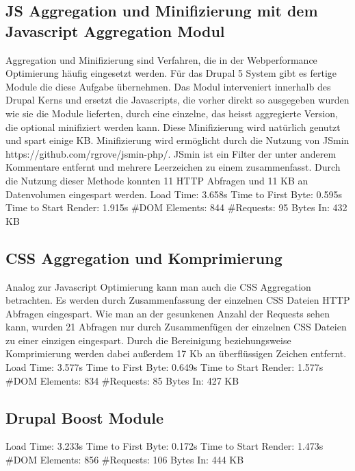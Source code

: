 

\subsection{JS Aggregation und Minifizierung mit dem Javascript Aggregation Modul}
Aggregation und Minifizierung sind Verfahren, die in der Webperformance Optimierung häufig eingesetzt werden. Für das Drupal 5 System gibt es fertige Module die diese Aufgabe übernehmen. Das Modul interveniert innerhalb des Drupal Kerns und ersetzt die Javascripts, die vorher direkt so ausgegeben wurden wie sie die Module lieferten, durch eine einzelne, das heisst aggregierte Version, die optional minifiziert werden kann. Diese Minifizierung wird natürlich genutzt und spart einige KB. Minifizierung wird ermöglicht durch die Nutzung von JSmin https://github.com/rgrove/jsmin-php/. JSmin ist ein Filter der unter anderem Kommentare entfernt und mehrere Leerzeichen zu einem zusammenfasst. Durch die Nutzung dieser Methode konnten 11 HTTP Abfragen und 11 KB an Datenvolumen eingespart werden.
Load Time: 3.658s
Time to First Byte: 0.595s
Time to Start Render: 1.915s
\#DOM Elements: 844 	
\#Requests: 95 %
Bytes In: 432 KB

\subsection{CSS Aggregation und Komprimierung}
Analog zur Javascript Optimierung kann man auch die CSS Aggregation betrachten. Es werden durch Zusammenfassung der einzelnen CSS Dateien HTTP Abfragen eingespart. Wie man an der gesunkenen Anzahl der Requests sehen kann, wurden 21 Abfragen nur durch Zusammenfügen der einzelnen CSS Dateien zu einer einzigen eingespart. Durch die Bereinigung beziehungsweise Komprimierung werden dabei außerdem 17 Kb an überflüssigen Zeichen entfernt. 
Load Time: 3.577s
Time to First Byte: 0.649s
Time to Start Render: 1.577s
\#DOM Elements: 834 	
\#Requests: 85 %
Bytes In: 427 KB
\subsection{Drupal Boost Module}
Load Time: 3.233s
Time to First Byte: 0.172s %
Time to Start Render: 1.473s
\#DOM Elements: 856 	
\#Requests: 106 %
Bytes In: 444 KB

